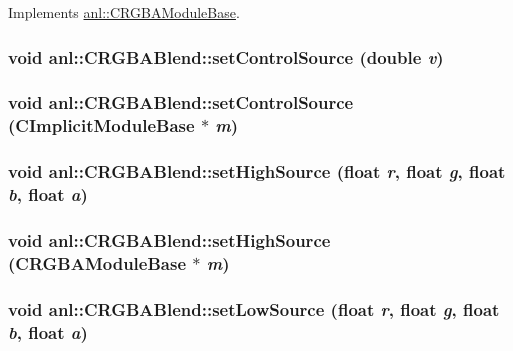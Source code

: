 Implements \hyperlink{classanl_1_1CRGBAModuleBase_afb6896d38ae92b9bb784fe5dc731ae67}{anl::CRGBAModuleBase}.\hypertarget{classanl_1_1CRGBABlend_a036e45818143c06d042aafd1946c0d29}{
\subsubsection[{setControlSource}]{\setlength{\rightskip}{0pt plus 5cm}void anl::CRGBABlend::setControlSource (double {\em v})}}
\label{classanl_1_1CRGBABlend_a036e45818143c06d042aafd1946c0d29}
\hypertarget{classanl_1_1CRGBABlend_a6c7486a11a1c09c53d8a7a9a3393019d}{
\subsubsection[{setControlSource}]{\setlength{\rightskip}{0pt plus 5cm}void anl::CRGBABlend::setControlSource ({\bf CImplicitModuleBase} $\ast$ {\em m})}}
\label{classanl_1_1CRGBABlend_a6c7486a11a1c09c53d8a7a9a3393019d}
\hypertarget{classanl_1_1CRGBABlend_ab69118e08ef7ebb1e506b9ec1a1a9f7a}{
\subsubsection[{setHighSource}]{\setlength{\rightskip}{0pt plus 5cm}void anl::CRGBABlend::setHighSource (float {\em r}, \/  float {\em g}, \/  float {\em b}, \/  float {\em a})}}
\label{classanl_1_1CRGBABlend_ab69118e08ef7ebb1e506b9ec1a1a9f7a}
\hypertarget{classanl_1_1CRGBABlend_ae5f388c31479fd45d0810e5c3a11be4d}{
\subsubsection[{setHighSource}]{\setlength{\rightskip}{0pt plus 5cm}void anl::CRGBABlend::setHighSource ({\bf CRGBAModuleBase} $\ast$ {\em m})}}
\label{classanl_1_1CRGBABlend_ae5f388c31479fd45d0810e5c3a11be4d}
\hypertarget{classanl_1_1CRGBABlend_afec2c97ec9f8b23afe1e4cacda23439d}{
\subsubsection[{setLowSource}]{\setlength{\rightskip}{0pt plus 5cm}void anl::CRGBABlend::setLowSource (float {\em r}, \/  float {\em g}, \/  float {\em b}, \/  float {\em a})}}
